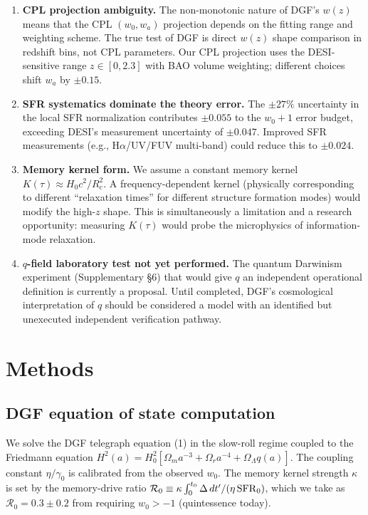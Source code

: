 \documentclass[12pt,a4paper]{article}
\begin{document}
\begin{enumerate}
\item {\bf CPL projection ambiguity.} The non-monotonic nature of DGF's $w(z)$ means that the CPL $(w_0,w_a)$ projection depends on the fitting range and weighting scheme. The true test of DGF is direct $w(z)$ shape comparison in redshift bins, not CPL parameters. Our CPL projection uses the DESI-sensitive range $z\in[0,2.3]$ with BAO volume weighting; different choices shift $w_a$ by $\pm0.15$.

\item {\bf SFR systematics dominate the theory error.} The $\pm27\%$ uncertainty in the local SFR normalization \cite{madau2014} contributes $\pm0.055$ to the $w_0+1$ error budget, exceeding DESI's measurement uncertainty of $\pm0.047$. Improved SFR measurements (e.g., H$\alpha$/UV/FUV multi-band) could reduce this to $\pm0.024$.

\item {\bf Memory kernel form.} We assume a constant memory kernel $K(\tau)\approx H_0c^2/R_c^2$. A frequency-dependent kernel (physically corresponding to different ``relaxation times'' for different structure formation modes) would modify the high-$z$ shape. This is simultaneously a limitation and a research opportunity: measuring $K(\tau)$ would probe the microphysics of information-mode relaxation.

\item {\bf $q$-field laboratory test not yet performed.} The quantum Darwinism experiment (Supplementary \S6) that would give $q$ an independent operational definition is currently a proposal. Until completed, DGF's cosmological interpretation of $q$ should be considered a model with an identified but unexecuted independent verification pathway.
\end{enumerate}

\section{Methods}

\subsection{DGF equation of state computation}

We solve the DGF telegraph equation (1) in the slow-roll regime coupled to the Friedmann equation $H^2(a)=H_0^2[\Omega_m a^{-3}+\Omega_r a^{-4}+\Omega_\Lambda q(a)]$. The coupling constant $\eta/\gamma_0$ is calibrated from the observed $w_0$. The memory kernel strength $\kappa$ is set by the memory-drive ratio $\mathcal{R}_0\equiv\kappa\int_0^{t_0}\Delta\,dt'/(\eta\,{\rm SFR}_0)$, which we take as $\mathcal{R}_0=0.3\pm0.2$ from requiring $w_0>-1$ (quintessence today).
\end{document}
